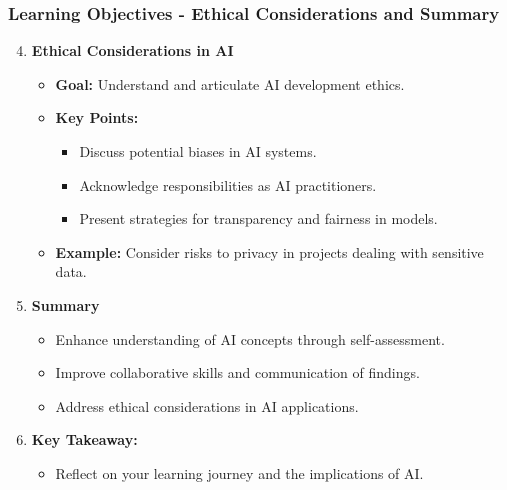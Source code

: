 \documentclass[aspectratio=169]{beamer}
\begin{document}
\begin{frame}[fragile]
    \frametitle{Learning Objectives - Ethical Considerations and Summary}
    \begin{enumerate}
        \setcounter{enumi}{3}
        \item \textbf{Ethical Considerations in AI}
        \begin{itemize}
            \item \textbf{Goal:} Understand and articulate AI development ethics.
            \item \textbf{Key Points:}
                \begin{itemize}
                    \item Discuss potential biases in AI systems.
                    \item Acknowledge responsibilities as AI practitioners.
                    \item Present strategies for transparency and fairness in models.
                \end{itemize}
            \item \textbf{Example:} Consider risks to privacy in projects dealing with sensitive data.
        \end{itemize}
    
        \item \textbf{Summary}
        \begin{itemize}
            \item Enhance understanding of AI concepts through self-assessment.
            \item Improve collaborative skills and communication of findings.
            \item Address ethical considerations in AI applications.
        \end{itemize}
        
        \item \textbf{Key Takeaway:}
        \begin{itemize}
            \item Reflect on your learning journey and the implications of AI.
        \end{itemize}
    \end{enumerate}
\end{frame}
\end{document}
